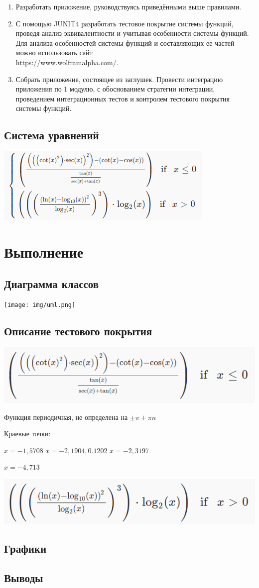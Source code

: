 \begin{enumerate}
\item Разработать приложение, руководствуясь приведёнными выше правилами.
\item С помощью JUNIT4 разработать тестовое покрытие системы функций,
проведя анализ эквивалентности и учитывая особенности системы функций.
Для анализа особенностей системы функций и составляющих ее частей можно
использовать сайт \\ https://www.wolframalpha.com/.
\item Собрать приложение, состоящее из заглушек.  Провести интеграцию приложения
по 1 модулю, с обоснованием стратегии интеграции, проведением интеграционных
тестов и контролем тестового покрытия системы функций.
\end{enumerate}
\subsection{Система уравнений}
\includegraphics[width=300bp]{img/system.png}
\section{Выполнение}
\subsection{Диаграмма классов}
\texttt{[image: img/uml.png]}
\subsection{Описание тестового покрытия}
\includegraphics[width=300bp]{img/first.png}

Функция периодичная, не определена на $\pm \pi + \pi n$

Краевые точки:

$x = -1,5708$
$x = -2,1904, 0.1202$
$x = -2,3197$

$x = -4,713$

\includegraphics[width=300bp]{img/second.png}
\subsection{Графики}
\subsection{Выводы}


